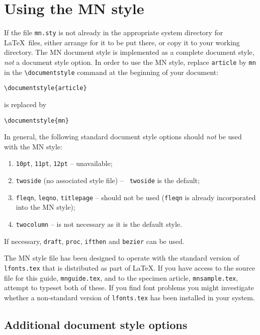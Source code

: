 \section{Using the MN style}

If the file \verb"mn.sty" is not already in the appropriate system
directory for \LaTeX\ files, either arrange for it to be put there,
or copy it to your working directory. The MN document style is implemented
as a complete document style, {\em not\/} a document style option. In
order to use the MN style, replace \verb"article" by \verb"mn" in the
\verb"\documentstyle" command at the beginning of your document:
%
\begin{verbatim}
\documentstyle{article}
\end{verbatim}
%
is replaced by
%
\begin{verbatim}
\documentstyle{mn}
\end{verbatim}
%
In general, the following standard document style options should {\em
not\/} be used with the MN style:
%
\begin{enumerate}
  \item {\tt 10pt}, {\tt 11pt}, {\tt 12pt} -- unavailable;
  \item {\tt twoside} (no associated style file) -- {\tt
     twoside} is the default;
  \item {\tt fleqn}, {\tt leqno}, {\tt titlepage} --
        should not be used (\verb"fleqn" is already incorporated into
        the MN style);
  \item {\tt twocolumn} -- is not necessary as it is the default style.
\end{enumerate}
%
If necessary, {\tt draft}, {\tt proc}, {\tt ifthen} and {\tt bezier} can be used.

The MN style file has been designed to operate with the standard version
of \verb"lfonts.tex" that is distributed as part of \LaTeX. If you have
access to the source file for this guide, \verb"mnguide.tex", and to the
specimen article, \verb"mnsample.tex", attempt to typeset both of these.
If you find font problems you might investigate whether a non-standard
version of \verb"lfonts.tex" has been installed in your system.

\subsection{Additional document style options}

